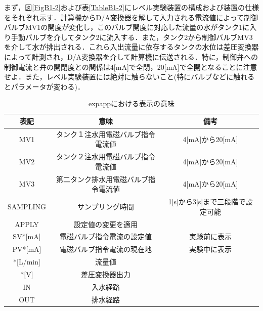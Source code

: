 \documentclass[12pt]{jsarticle}
\begin{document}
まず，図\ref{FigB1-2}および表\ref{TableB1-2}にレベル実験装置の構成および装置の仕様をそれぞれ示す．計算機からD/A変換器を解して入力される電流値によって制御バルブMV1の開度が変化し，このバルブ開度に対応した流量の水がタンク1に入り手動バルブを介してタンク2に流入する．また，タンク2から制御バルブMV3を介して水が排出される．これら入出流量に依存するタンクの水位は差圧変換器によって計測され，D/A変換器を介して計算機に伝送される．特に，制御弁への制御電流と弁の開閉度との関係は4[mA]で全閉，20[mA]で全開となることに注意せよ．また，レベル実験装置には絶対に触らないこと(特にバルブなどに触れるとパラメータが変わる)．
\begin{table}[tb]
  \label{TableB1-1}
  \caption{expappにおける表示の意味}
  \begin{tabular}{c|c|c} \hline
    表記 & 意味 & 備考\\ \hline \hline
    MV1 & タンク１注水用電磁バルブ指令電流値 & 4[mA]から20[mA] \\ \hline
    MV2 & タンク２注水用電磁バルブ指令電流値 & 4[mA]から20[mA] \\ \hline
    MV3 & 第二タンク排水用電磁バルブ指令電流値 & 4[mA]から20[mA] \\ \hline
    SAMPLING & サンプリング時間 & 1[s]から3[s]まで三段階で設定可能 \\ \hline
    APPLY & 設定値の変更を適用 & \\ \hline
    SV*[mA] & 電磁バルブ指令電流の設定値 & 実験前に表示 \\ \hline
    PV*[mA] & 電磁バルブ指令電流の現在地 & 実験中に表示 \\ \hline
    *[L/min] & 流量値 & \\ \hline
    *[V] & 差圧変換器出力 & \\ \hline
    IN & 入水経路 & \\ \hline
    OUT & 排水経路 & \\ \hline
  \end{tabular}
\end{table}
\end{document}
